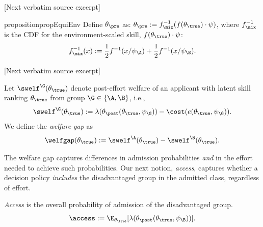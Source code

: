 \documentclass[10pt]{article}
\begin{document}
\begin{ReviewVerbatim}
{[Next verbatim source excerpt]

\begin{restatable}{proposition}{propEquiEnv}\label{prop:equi-env}
Define $\theta_\pre$ as:
	\(\theta_\pre := f^{-1}_\mix(f(\theta_\true)\cdot \psi)\),
		where $f^{-1}_\mix$	is the CDF for the environment-scaled skill, $f(\theta_\true)\cdot \psi$:
	\begin{equation*}
	f^{-1}_\mix(x) := \frac{1}{2}f^{-1}(x/\psi_\A)+ \frac{1}{2}f^{-1}(x/\psi_\B).
	\end{equation*}


[Next verbatim source excerpt]

\begin{definition}
	Let $\swelf^\G(\theta_\true)$ denote post-effort welfare of an applicant with latent skill ranking $\theta_\true$ from group $\G \in \{\A, \B\}$, i.e.,
	\begin{equation}
	\swelf^\G(\theta_\true):= \lambda(\theta_\post(\theta_\true, \psi_\G)) - \cost(e(\theta_\true, \psi_\G)).
	\end{equation}
	We define the \emph{%
		welfare gap} as %
	\begin{equation*}
		\welfgap(\theta_\true):= \swelf^\A(\theta_\true) - \swelf^\B(\theta_\true).
	\end{equation*}
\end{definition}

The welfare gap captures differences in admission probabilities \textit{and} in the effort needed to achieve such probabilities. Our next notion, \textit{access}, captures whether a decision policy \emph{includes} the disadvantaged group in the admitted class, regardless of effort. %

\begin{definition}[Access]
 \emph{Access} is the overall probability of admission of the disadvantaged group.
	\begin{equation*}
		\access :=  \E_{\theta_\true}[\lambda(\theta_\post(\theta_\true, \psi_\B))].
	\end{equation*}
\end{definition}


\end{restatable}}
\end{ReviewVerbatim}
\end{document}

